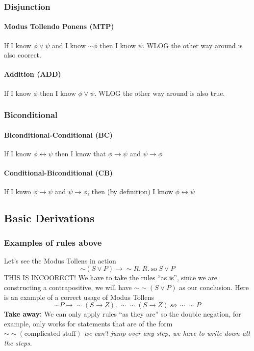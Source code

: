 \documentclass[10pt]{article}
\renewcommand{\iff}{\leftrightarrow}
\begin{document}
\subsubsection{Disjunction}
\paragraph{Modus Tollendo Ponens (MTP)} If I know $\phi \vee \psi$ and 
I know $\sim\phi$ then I know $\psi$. WLOG the other way around is also coorect.
\paragraph{Addition (ADD)} If I know $\phi$ then  I know $\phi \vee \psi$.
 WLOG the other way around is also true.

\subsubsection{Biconditional}
\paragraph{Biconditional-Conditional (BC)} If I know $\phi \iff \psi$ then I 
know that $\phi \rightarrow \psi$ and $\psi \rightarrow \phi$
\paragraph{Conditional-Biconditional (CB)} If I knwo $\phi \rightarrow \psi$ 
and $\psi \rightarrow \phi$, then (by definition) I know  $\phi \iff \psi$

\subsection{Basic Derivations}
\subsubsection{Examples of rules above}
Let's see the Modus Tollens in action
\begin{equation*}
    \sim (S\vee P) \rightarrow \sim R.~ R. ~\text{so}~ S\vee P
\end{equation*}
THIS IS INCOORECT! We have to take the rules ``as is'', since we are constructing a
contrapositive, we will have $\sim\sim (S\vee P)$ as our conclusion. Here is an example of a 
correct usage of Modus Tollens
\begin{equation*}
    \sim P \rightarrow \sim (S\rightarrow Z). ~ \sim\sim (S\rightarrow Z) ~ so ~ \sim\sim P
\end{equation*}
\textbf{Take away:} We can only apply rules ``as they are'' so the double negation, for example,
only works for statements that are of the form $\sim\sim(\text{complicated stuff})$ \textit{we can't 
jump over any step, we have to write down all the steps.}
\end{document}
